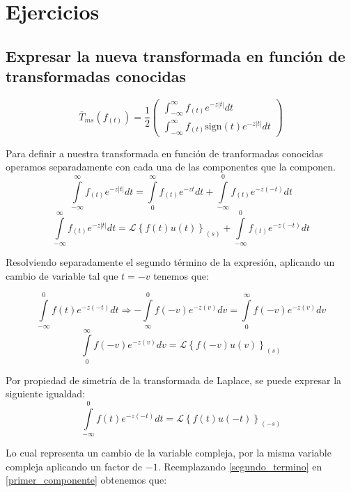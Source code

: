 \documentclass[12pt]{article}
\begin{document}
\section{Ejercicios}

\subsection{Expresar la nueva transformada en función de transformadas conocidas}

\begin{equation}
\overline{T}_{ms}(f_{(t)}) = \frac12
\begin{pmatrix}
\int_{-\infty}^{\infty} f_{(t)} e^{-z |t|}dt\\
\int_{-\infty}^{\infty} f_{(t)} \textrm{sign}(t)e^{-z |t|}dt
\end{pmatrix}
\label{transformada_original}
\end{equation}

Para definir a nuestra transformada en función de tranformadas conocidas operamos separadamente con cada una de las componentes que la componen.
$$
\int\limits_{-\infty}^{\infty} f_{(t)} e^{-z |t|}dt= \int\limits_{0}^{\infty} f_{(t)} e^{-z t}dt + \int\limits_{-\infty}^{0} f_{(t)} e^{-z (-t)}dt$$
\begin{equation}
\int\limits_{-\infty}^{\infty} f_{(t)} e^{-z |t|}dt= \mathcal{L}\left\{f(t)u(t)\right\}_{(s)} +  \int\limits_{-\infty}^{0} f_{(t)} e^{-z (-t)}dt
\label{primer_componente}
\end{equation}

Resolviendo separadamente el segundo término de la expresión, aplicando un cambio de variable tal que $t=-v$ tenemos que:

$$ \int\limits_{-\infty}^{0} f(t) e^{-z (-t)}dt \Rightarrow - \int\limits_{\infty}^{0} f(-v) e^{-z (v)}dv =  \int\limits_{0}^{\infty} f(-v) e^{-z (v)}dv $$
$$\int\limits_{0}^{\infty} f(-v) e^{-z (v)}dv = \mathcal{L}\left\{f(-v) u(v)\right\}_{(s)}$$

Por propiedad de simetría de la transformada de Laplace, se puede expresar la siguiente igualdad:
 \begin{equation}
 \int\limits_{-\infty}^{0} f(t) e^{-z (-t)}dt = \mathcal{L}\left\{f(t)u(-t)\right\}_{(-s)} 
 \label{segundo_termino}
 \end{equation}
 
Lo cual representa un cambio de la variable compleja, por la misma variable compleja aplicando un factor de $-1$. Reemplazando \ref{segundo_termino} en \ref{primer_componente} obtenemos que:
\end{document}

